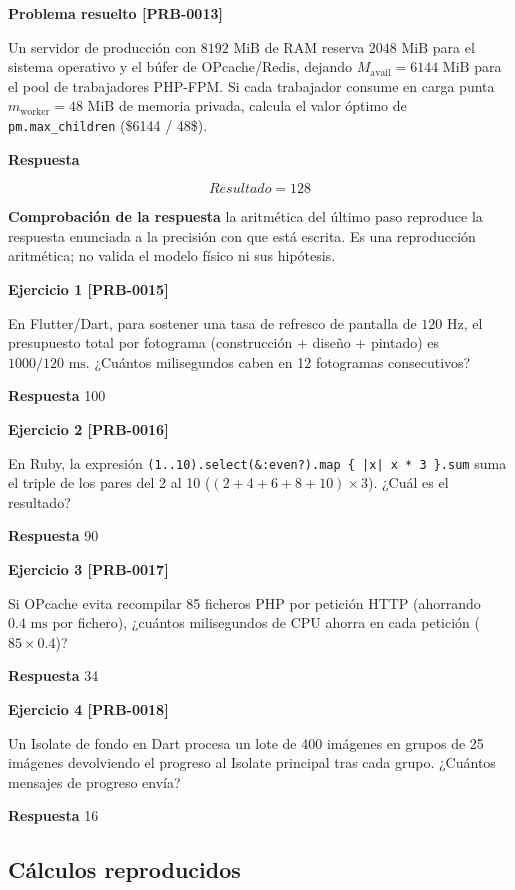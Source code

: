 \documentclass{book}
\begin{document}
\noindent\textbf{Problema resuelto [PRB-0013]}

Un servidor de producción con \(8192\text{ MiB}\) de RAM reserva \(2048\text{ MiB}\) para el sistema operativo y el búfer de OPcache/Redis, dejando \(M_{\text{avail}} = 6144\text{ MiB}\) para el pool de trabajadores PHP-FPM. Si cada trabajador consume en carga punta \(m_{\text{worker}} = 48\text{ MiB}\) de memoria privada, calcula el valor óptimo de \texttt{pm.max\_children} (\$6144 / 48\$).

\noindent\textbf{Respuesta}

\[
Resultado = 128
\]

\noindent\textbf{Comprobación de la respuesta} la aritmética del último paso reproduce la respuesta enunciada a la precisión con que está escrita. Es una reproducción aritmética; no valida el modelo físico ni sus hipótesis.

\noindent\textbf{Ejercicio 1 [PRB-0015]}

En Flutter/Dart, para sostener una tasa de refresco de pantalla de \(120\text{ Hz}\), el presupuesto total por fotograma (construcción + diseño + pintado) es \(1000 / 120\text{ ms}\). ¿Cuántos milisegundos caben en 12 fotogramas consecutivos?

\noindent\textbf{Respuesta} 100

\noindent\textbf{Ejercicio 2 [PRB-0016]}

En Ruby, la expresión \texttt{(1..10).select(\&:even?).map \{ |x| x * 3 \}.sum} suma el triple de los pares del 2 al 10 (\((2+4+6+8+10) \times 3\)). ¿Cuál es el resultado?

\noindent\textbf{Respuesta} 90

\noindent\textbf{Ejercicio 3 [PRB-0017]}

Si OPcache evita recompilar 85 ficheros PHP por petición HTTP (ahorrando \(0.4\text{ ms}\) por fichero), ¿cuántos milisegundos de CPU ahorra en cada petición (\(85 \times 0.4\))?

\noindent\textbf{Respuesta} 34

\noindent\textbf{Ejercicio 4 [PRB-0018]}

Un Isolate de fondo en Dart procesa un lote de 400 imágenes en grupos de 25 imágenes devolviendo el progreso al Isolate principal tras cada grupo. ¿Cuántos mensajes de progreso envía?

\noindent\textbf{Respuesta} 16

\subsection*{Cálculos reproducidos}
\end{document}

